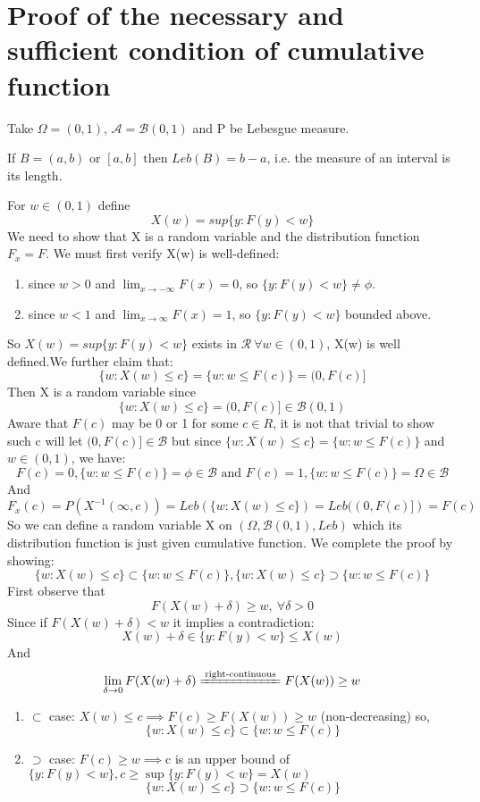 \documentclass[../Probability_Theory.tex]{subfiles}
\begin{document}
\section{Proof of the necessary and sufficient condition of cumulative function}\label{sec:proofcfnscondition}

Take $\Omega=(0,1)$, $\mathcal{A}=\mathcal{B}(0,1)$ and P be Lebesgue measure.
\begin{remark}
If $B=(a,b)\text{ or }[a,b] \text{ then } Leb(B)=b-a$, i.e. the measure of an interval is its length.
\end{remark}
For $w\in(0,1)$ define $$X(w)=sup\{y:F(y)<w\}$$
We need to show that X is a random variable and the distribution function $F_x=F$.
We must first verify X(w) is well-defined:
\begin{enumerate}
\item since $w>0$ and $\lim_{x\rightarrow -\infty}F(x)=0$, so $\{y:F(y)<w\}\neq\phi$.
\item since $w<1$ and $\lim_{x\rightarrow \infty}F(x)=1$, so $\{y:F(y)<w\}$ bounded above.
\end{enumerate}
So $X(w)=sup\{y:F(y)<w\}$ exists in $\mathcal{R} \ \forall w\in(0,1)$, X(w) is well defined.We further claim that:
$$\{w:X(w)\leq c\}=\{w:w\leq F(c)\}=(0,F(c)]$$ 
Then X is a random variable since $$\{w:X(w)\leq c\}=(0,F(c)]\in \mathcal{B}(0,1)$$
Aware that $F(c)$ may be 0 or 1 for some $c\in R$, it is not that trivial to show such c will let $(0,F(c)]\in \mathcal{B}$ but since $\{w:X(w)\leq c\}=\{w:w\leq F(c)\}$ and $w\in (0,1)$, we have:
$$F(c)=0,\{w:w\leq F(c)\}=\phi\in\mathcal{B}\text{ and }F(c)=1,\{w:w\leq F(c)\}=\Omega\in\mathcal{B}$$
And $$F_x(c)=P(X^{-1}(\infty,c))=Leb(\{w:X(w)\leq c\})=Leb((0,F(c)])=F(c)$$
So we can define a random variable X on $(\Omega,\mathcal{B}(0,1),Leb)$ which its distribution function is just given cumulative function. We complete the proof by showing:
$$\{w:X(w)\leq c\}\subset\{w:w\leq F(c)\},\{w:X(w)\leq c\}\supset\{w:w\leq F(c)\}$$
First observe that $$F(X(w)+\delta)\geq w,\ \forall \delta>0$$ Since if $F(X(w)+\delta)<w$ it implies a contradiction: $$X(w)+\delta\in\{y:F(y)<w\}\leq X(w)$$ And $$\lim_{\delta\rightarrow 0}F(X(w)+\delta)\xlongequal{\text{right-continuous}}F(X(w))\geq w$$  
\begin{enumerate}
\item $\subset$ case: $X(w)\leq c\implies F(c)\geq F(X(w))\geq w $ (non-decreasing) so, 
 $$\{w:X(w)\leq c\}\subset\{w:w\leq F(c)\}$$
\item $\supset$ case: $F(c)\geq w\implies$c is an upper bound of $\{y:F(y)<w\}, c\geq\sup\{y:F(y)<w\}=X(w)$
 $$\{w:X(w)\leq c\}\supset\{w:w\leq F(c)\}$$
\end{enumerate}
\end{document}
